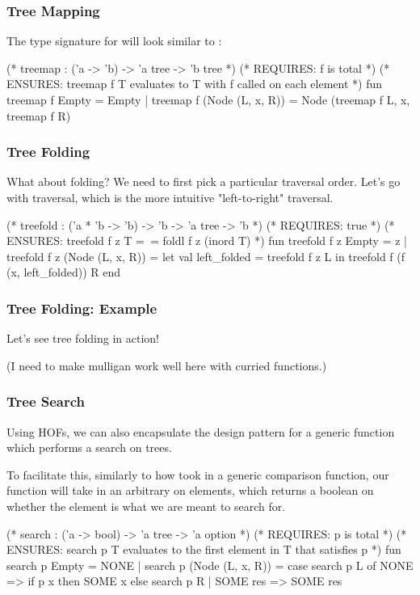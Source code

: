 \documentclass[aspectratio=169]{beamer}
\begin{document}
\begin{frame}[fragile]
  \frametitle{Tree Mapping}

  The type signature for  will look similar to :

  \begin{codeblock}
    (* treemap : ('a -> 'b) -> 'a tree -> 'b tree *)
    (* REQUIRES: f is total *)
    (* ENSURES: treemap f T evaluates to T with f called on each element *)
    fun treemap f Empty = Empty
      | treemap f (Node (L, x, R)) = Node (treemap f L, x, treemap f R)
  \end{codeblock}
\end{frame}

\begin{frame}[fragile]
  \frametitle{Tree Folding}

  What about folding? We need to first pick a particular traversal order. Let's
  go with  traversal, which is the more intuitive "left-to-right"
  traversal.

  \begin{codeblock}
    (* treefold : ('a * 'b -> 'b) -> 'b -> 'a tree -> 'b *)
    (* REQUIRES: true *)
    (* ENSURES: treefold f z T =~= foldl f z (inord T) *)
    fun treefold f z Empty = z
      | treefold f z (Node (L, x, R)) =
          let
            val left_folded = treefold f z L
          in
            treefold f (f (x, left_folded)) R
          end
  \end{codeblock}
\end{frame}

\begin{frame}[fragile]
  \frametitle{Tree Folding: Example}

  Let's see tree folding in action!

  (I need to make mulligan work well here with curried functions.)
\end{frame}

\begin{frame}[fragile]
  \frametitle{Tree Search}

  Using HOFs, we can also encapsulate the design pattern for a generic function which
  performs a search on trees.

  To facilitate this, similarly to how  took in a generic comparison function,
  our  function will take in an arbitrary  on elements, which
  returns a boolean on whether the element is what we are meant to search for. 

  \begin{codeblock}
    (* search : ('a -> bool) -> 'a tree -> 'a option *)
    (* REQUIRES: p is total *)
    (* ENSURES: search p T evaluates to the first element in T that satisfies p *)
    fun search p Empty = NONE
      | search p (Node (L, x, R)) = 
        case search p L of
          NONE => 
            if p x then SOME x 
            else search p R 
        | SOME res => SOME res
  \end{codeblock}
\end{frame}
\end{document}
